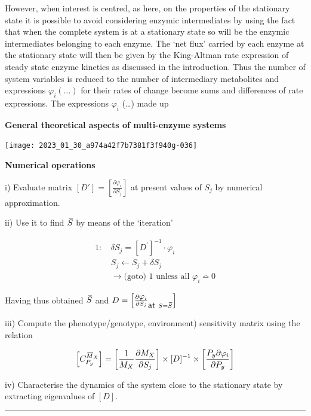 However, when interest is centred, as here, on the properties of the stationary state it is possible to avoid considering enzymic intermediates by using the fact that when the complete system is at a stationary state so will be the enzymic intermediates belonging to each enzyme. The `net flux' carried by each enzyme at the stationary state will then be given by the King-Altman rate expression of steady state enzyme kinetics as discussed in the introduction. Thus the number of system variables is reduced to the number of intermediary metabolites and expressions $\varphi_{i}(\ldots)$ for their rates of change become sums and differences of rate expressions. The expressions $\varphi_{i}$ (\ldots) made up

\bigskip
\centerline{\bf\large General theoretical aspects of multi-enzyme systems}

\begin{center}
\texttt{[image: 2023\_01\_30\_a974a42f7b7381f3f940g-036]}
\end{center}

\pagebreak
\centerline{\bf\large Numerical operations}

i) Evaluate matrix $\left[D'\right]=\left[\frac{\partial \varphi_{i}}{\partial S_{j}}\right]$ at present values of $S_{j}$ by numerical approximation.

ii) Use it to find $\,\overline{\!{S}}$ by means of the `iteration'

$$
\begin{aligned}
\mbox{1: } & \delta S_{j} = \left[D^{\prime}\right]^{-1} \cdot \varphi_{i} \\
& S_{j} \leftarrow S_{j} + \delta S_{j} \\
& \rightarrow \mbox{(goto) } 1 \text { unless all } \varphi_{i} \bumpeq 0
\end{aligned}
$$

Having thus obtained $\,\overline{\!{S}}$ and $D=\left[\frac{\partial \varphi_{i}}{\partial {S_{j}}}_{\mbox{at }S=\olsi{S}}\right]$

iii) Compute the phenotype/genotype, environment) sensitivity matrix using the relation

$$
\left[
C_{P_y}^{\olsi{M}_X}\right] = \left[\frac{1}{M_X} \frac{\partial M_X}{\partial S_j}\right] \times [D]^{-1} \times\left[\frac{P_y \partial \varphi_i}{\partial P_y}\right]
$$

iv) Characterise the dynamics of the system close to the stationary state by extracting eigenvalues of $\left[ D \right]$.

\noindent\rule{\textwidth}{1pt}


